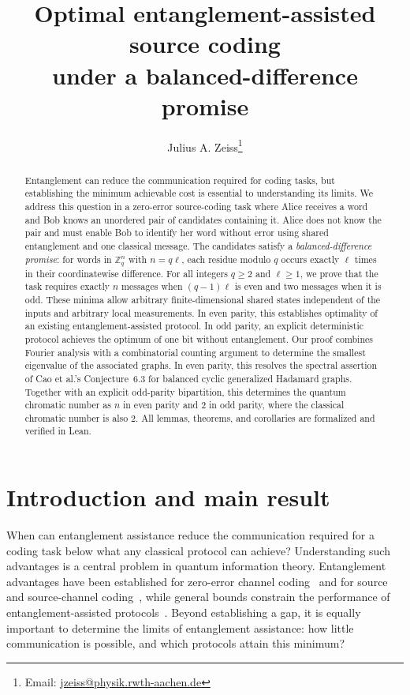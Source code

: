 \documentclass[11pt,a4paper]{article}
\title{Optimal entanglement-assisted source coding\\
under a balanced-difference promise}
\author{Julius A. Zeiss\thanks{Email: \href{mailto:jzeiss@physik.rwth-aachen.de}{jzeiss@physik.rwth-aachen.de}}}
\date{}
\numberwithin{equation}{section}
\numberwithin{figure}{section}
\numberwithin{table}{section}
\numberwithin{footnote}{section}
\theoremstyle{informal}\newtheorem*{informaltheorem}{Informal theorem}
\theoremstyle{definition}\newtheorem{example}{Example}[section]
\theoremstyle{remark}\newtheorem{remark}[theorem]{Remark}
\newcommand{\Z}{\mathbb Z}
\begin{document}
\maketitle
\begin{abstract}
Entanglement can reduce the communication required for coding tasks,
but establishing the minimum achievable cost is essential to understanding
its limits. We address this question in a zero-error source-coding task
where Alice receives a word and Bob knows an unordered pair of candidates
containing it. Alice does not know the pair and must enable Bob to identify
her word without error using shared entanglement and one classical message.
The candidates satisfy a \emph{balanced-difference promise}: for words in
\(\Z_q^n\) with \(n=q\ell\), each residue modulo \(q\) occurs
exactly \(\ell\) times in their coordinatewise difference. For all
integers \(q\geq2\) and \(\ell\geq1\), we prove that the task
requires exactly \(n\) messages when \((q-1)\ell\) is even and
two messages when it is odd. These minima
allow arbitrary finite-dimensional shared states independent of the
inputs and arbitrary local measurements. In even parity, this establishes
optimality of an existing entanglement-assisted protocol. In odd parity, an explicit
deterministic protocol achieves the optimum of one bit without entanglement.
Our proof combines Fourier analysis with a combinatorial counting argument
to determine the smallest eigenvalue of the associated graphs. In even
parity, this resolves the spectral assertion of Cao et al.'s Conjecture~6.3
for balanced cyclic generalized Hadamard graphs. Together with an
explicit odd-parity bipartition, this determines the quantum chromatic
number as \(n\) in even parity and \(2\) in odd parity, where the
classical chromatic number is also \(2\). All lemmas, theorems, and
corollaries are formalized and verified in Lean.
\end{abstract}

\setcounter{tocdepth}{1}
\begingroup
\makeatletter
\patchcmd{\l@section}{1.0em}{0.6em}{}{}
\makeatother
\tableofcontents
\endgroup
\setcounter{tocdepth}{1}
\clearpage

\section{Introduction and main result}\label{sec:introduction}
When can entanglement assistance reduce the communication required for a
coding task below what any classical protocol can achieve? Understanding
such advantages is a central problem in quantum information theory.
Entanglement advantages have been established for zero-error channel
coding~\cite{clmw,lmmor} and for source and source-channel
coding~\cite{bblps}, while general bounds constrain the performance
of entanglement-assisted protocols~\cite{beigi,cmrssw}.
Beyond establishing a gap, it is equally important to determine the
limits of entanglement assistance: how little communication is possible,
and which protocols attain this minimum?
\end{document}
